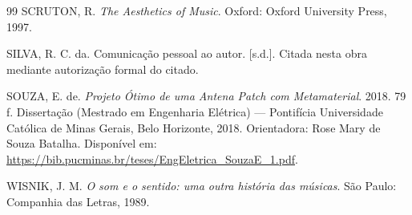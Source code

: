 \documentclass[12pt,a4paper]{article}
\begin{document}
\begin{thebibliography}{99}
SCRUTON, R. \textit{The Aesthetics of Music}. Oxford: Oxford University Press, 1997.

SILVA, R. C. da. Comunicação pessoal ao autor. [s.d.]. Citada nesta obra mediante autorização formal do citado.

SOUZA, E. de. \textit{Projeto Ótimo de uma Antena Patch com Metamaterial}. 2018. 79 f. Dissertação (Mestrado em Engenharia Elétrica) --- Pontifícia Universidade Católica de Minas Gerais, Belo Horizonte, 2018. Orientadora: Rose Mary de Souza Batalha. Disponível em: \url{https://bib.pucminas.br/teses/EngEletrica_SouzaE_1.pdf}.

WISNIK, J. M. \textit{O som e o sentido: uma outra história das músicas}. São Paulo: Companhia das Letras, 1989.

\end{thebibliography}
\end{document}
